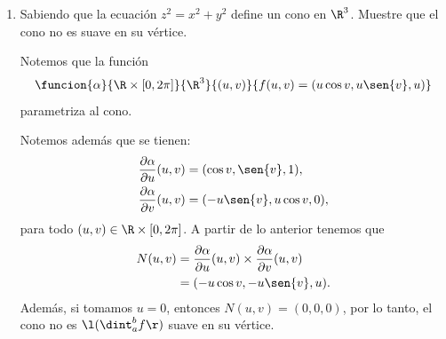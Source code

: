 \documentclass[a4,11pt]{aleph-examen}
\begin{document}
\begin{preguntas}
\begin{respuesta}
\begin{respuesta}
\begin{respuesta}
\begin{enumerate}
\begin{respuesta}
    Notemos que si tomamos 
    \[
        \l\{
        \begin{array}{l}
            x(u,v) = 2\sen{u}\cos{v},\\
            y(u,v) = 3\sen{u}\sen{v},\\
            z(u,v) = \cos{u}.
        \end{array}
        \r.
    \]
    Entonces:
    \begin{align*}
        \dfrac{x^2(u,v)}{4} + \dfrac{y^2(u,v)}{9} + z^2(u,v) &= \dfrac{(2\sen{u}\cos{v})^2}{4} + \dfrac{(3\sen{u}\sen{v})^2}{9} + (\cos{u})^2\\
        &= \sen^2{u}\cos^2{v} + \sen^2{u}\sen^2{v} + \cos^2{u}\\
        &= 1.
    \end{align*}
    Es decir, la respectiva superficie verifica la ecuación
    \[
        \dfrac{x^2}{4} + \dfrac{y^2}{9} + z^2 = 1
    \]
    esto es, la ecuación de una elipsoide.
\end{respuesta}

\item 
    Sabiendo que la ecuación $z^2 = x^2 + y^2$ define un cono en $\R^3$. Muestre que el cono no es suave en su vértice.

\begin{respuesta}
    Notemos que la función 
    \[
        \funcion{\alpha}{\R\times[0,2\pi]}{\R^3}
        {(u,v)}{f(u,v)=(u\cos{v},u\sen{v},u)}
	\]
    parametriza al cono. 
    
    \noindent	Notemos además que se tienen:
    \begin{align*}
        \dfrac{\partial \alpha}{\partial u}(u,v) &= (\cos{v},\sen{v},1),\\
        \dfrac{\partial \alpha}{\partial v}(u,v) &= (-u\sen{v},u\cos{v},0),
    \end{align*}
    para todo $(u,v)\in\R\times[0,2\pi]$. A partir de lo anterior tenemos que
    \begin{align*}
        N(u,v) &= \dfrac{\partial \alpha}{\partial u}(u,v) \times \dfrac{\partial \alpha}{\partial v}(u,v)\\
            &= (-u\cos{v},-u\sen{v},u).
    \end{align*}
    Además, si tomamos $u=0$, entonces $N(u,v)=(0,0,0)$, por lo tanto, el cono no es $\l(\dint_a^b f\r)$ suave en su vértice.
\end{respuesta}



\end{enumerate}
\end{respuesta}
\end{respuesta}
\end{respuesta}
\end{preguntas}
\end{document}
